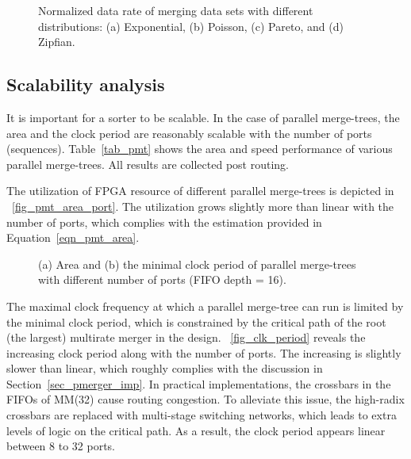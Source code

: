 \documentclass[10pt, conference]{IEEEtran}
\begin{document}
\begin{figure}[bt]
\caption{Normalized data rate of merging data sets with different distributions: (a) Exponential, (b) Poisson, (c) Pareto, and (d) Zipfian.}\label{fig_distribution}
\end{figure}

\subsection{Scalability analysis}

It is important for a sorter to be scalable.
In the case of parallel merge-trees, the area and the clock period are reasonably scalable with the number of ports (sequences).
Table~\ref{tab_pmt} shows the area and speed performance of various parallel merge-trees.
All results are collected post routing.

The utilization of FPGA resource of different parallel merge-trees is depicted in \figurename~\ref{fig_pmt_area_port}.
The utilization grows slightly more than linear with the number of ports, which complies with the estimation provided in Equation~\ref{eqn_pmt_area}.

\begin{figure}[bt]
\caption{(a) Area and (b) the minimal clock period of parallel merge-trees with different number of ports (FIFO depth = 16).}\label{fig_port}
\end{figure}

The maximal clock frequency at which a parallel merge-tree can run is limited by the minimal clock period,
which is constrained by the critical path of the root (the largest) multirate merger in the design.
\figurename~\ref{fig_clk_period} reveals the increasing clock period along with the number of ports.
The increasing is slightly slower than linear, which roughly complies with the discussion in Section~\ref{sec_pmerger_imp}.
In practical implementations, the crossbars in the FIFOs of MM(32) cause routing congestion.
To alleviate this issue, the high-radix crossbars are replaced with multi-stage switching networks, which leads to extra levels of logic on the critical path.
As a result, the clock period appears linear between 8 to 32 ports.
\end{document}
